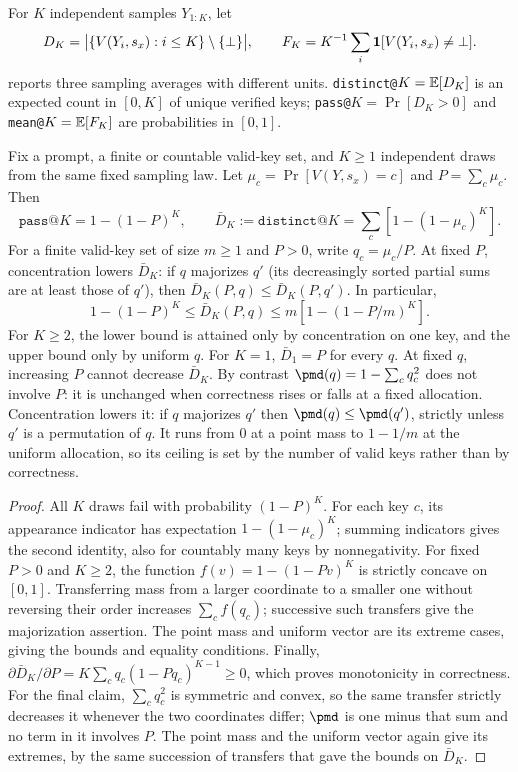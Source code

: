 For $K$ independent samples $Y_{1:K}$, let
\[
  D_K=\bigl|\{V(Y_i,s_x):i\le K\}\setminus\{\bot\}\bigr|,
  \qquad
  F_K=K^{-1}\sum_i \mathbf 1[V(Y_i,s_x)\neq\bot].
\]
\mb{} reports three sampling averages with different units. \texttt{distinct@}$K
=\mathbb E[D_K]$ is an expected count in $[0,K]$ of unique verified keys;
\texttt{pass@}$K=\Pr[D_K>0]$ and \texttt{mean@}$K=\mathbb E[F_K]$ are probabilities
in $[0,1]$.

\begin{lemma}
\label{lem:success-breadth}
Fix a prompt, a finite or countable valid-key set, and $K\ge1$ independent
draws from the same fixed sampling law. Let
$\mu_c=\Pr[V(Y,s_x)=c]$ and $P=\sum_c\mu_c$. Then
\begin{equation}
 \texttt{pass@}K=1-(1-P)^K,\qquad
 \bar D_K:=\texttt{distinct@}K=\sum_c[1-(1-\mu_c)^K].
 \label{eq:success-breadth-identities}
\end{equation}
For a finite valid-key set of size $m\ge1$ and $P>0$, write $q_c=\mu_c/P$.
At fixed $P$, concentration lowers $\bar D_K$: if $q$ majorizes $q'$
(its decreasingly sorted partial sums are at least those of $q'$), then
$\bar D_K(P,q)\le\bar D_K(P,q')$. In particular,
\begin{equation}
 1-(1-P)^K\le\bar D_K(P,q)\le m[1-(1-P/m)^K].
 \label{eq:fixed-success-breadth-bounds}
\end{equation}
For $K\ge2$, the lower bound is attained only by concentration on one key,
and the upper bound only by uniform $q$. For $K=1$, $\bar D_1=P$ for every $q$.
At fixed $q$, increasing $P$ cannot decrease $\bar D_K$.
By contrast $\pmd(q)=1-\sum_c q_c^2$ does not involve $P$: it is unchanged when
correctness rises or falls at a fixed allocation. Concentration lowers it: if
$q$ majorizes $q'$ then $\pmd(q)\le\pmd(q')$, strictly unless $q'$ is a
permutation of $q$. It runs from $0$ at a point mass to
$1-1/m$ at the uniform allocation, so its ceiling is set by the number of
valid keys rather than by correctness.
\end{lemma}
\begin{proof}
All $K$ draws fail with probability $(1-P)^K$. For each key $c$, its
appearance indicator has expectation $1-(1-\mu_c)^K$; summing indicators
gives the second identity, also for countably many keys by nonnegativity.
For fixed $P>0$ and $K\ge2$, the function
$f(v)=1-(1-Pv)^K$ is strictly concave on $[0,1]$.
Transferring mass from a larger coordinate to a smaller one without reversing
their order increases $\sum_c f(q_c)$; successive such transfers give the
majorization assertion. The point mass and uniform vector are its extreme
cases, giving the bounds and equality conditions. Finally,
$\partial\bar D_K/\partial P=K\sum_c q_c(1-Pq_c)^{K-1}\ge0$,
which proves monotonicity in correctness.
For the final claim, $\sum_c q_c^2$ is symmetric and convex, so the
same transfer strictly decreases it whenever the two coordinates differ;
$\pmd$ is one minus that sum and no term in it involves $P$. The point mass and
the uniform vector again give its extremes, by the same succession of transfers
that gave the bounds on $\bar D_K$.
\end{proof}

